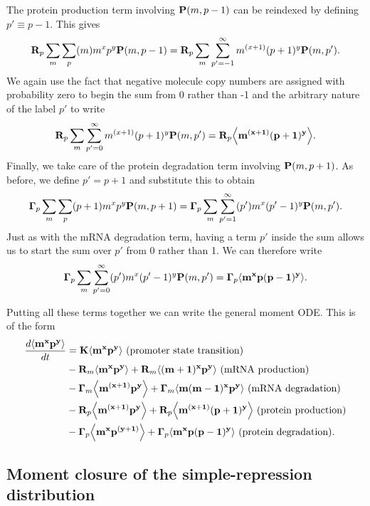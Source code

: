 The protein production term involving $\mathbf{P}(m, p - 1)$ can be reindexed by 
defining $p' \equiv p - 1$. This gives
\begin{equation}
  \mathbf{R}_p \sum_m \sum_p (m) m^x p^y \mathbf{P}(m, p - 1) =
  \mathbf{R}_p \sum_m \sum_{p'=-1}^\infty m^{(x + 1)} (p + 1)^y \mathbf{P}(m, p').
\end{equation}
We again use the fact that negative molecule copy numbers are assigned with
probability zero to begin the sum from 0 rather than -1 and the arbitrary nature
of the label $p'$ to write
\begin{equation}
  \mathbf{R}_p \sum_m \sum_{p'=0}^\infty m^{(x + 1)} (p + 1)^y \mathbf{P}(m, p') =
  \mathbf{R}_p \mathbf{\left\langle m^{(x + 1)} (p + 1)^y \right\rangle}.
\end{equation}
Finally, we take care of the protein degradation term involving $\mathbf{P}(m, p + 1)$.
As before, we define $p' = p + 1$ and substitute this to obtain
\begin{equation}
  \mathbf{\Gamma}_p \sum_m \sum_p (p + 1) m^x p^y \mathbf{P}(m, p + 1) =
  \mathbf{\Gamma}_p \sum_m \sum_{p'=1}^\infty (p') m^x (p' - 1)^y \mathbf{P}(m, p').
\end{equation}
Just as with the mRNA degradation term, having a term $p'$  inside the sum
allows us to start the sum over $p'$ from 0 rather than 1. We can therefore
write
\begin{equation}
  \mathbf{\Gamma}_p \sum_m \sum_{p'=0}^\infty (p') m^x (p' - 1)^y \mathbf{P}(m, p') =
  \mathbf{\Gamma}_p \mathbf{\left\langle m^x p (p - 1)^y \right\rangle}.
\end{equation}

Putting all these terms together we can write the general moment ODE. This is
of the form
\begin{equation}
  \begin{aligned}
    {d{\mathbf{\left\langle m^x p^y \right\rangle}} \over dt} &=
    \mathbf{K} \mathbf{\left\langle m^x p^y \right\rangle}
    \text{  (promoter state transition)}\\
    &- \mathbf{R}_m \mathbf{\left\langle m^x p^y \right\rangle} + \mathbf{R}_m \mathbf{\left\langle (m+1)^x p^y \right\rangle}
    \text{  (mRNA production)}\\
    &- \mathbf{\Gamma}_m \mathbf{\left\langle m^{(x + 1)} p^y \right\rangle} + \mathbf{\Gamma}_m \mathbf{\left\langle m (m - 1)^x p^y \right\rangle}
    \text{  (mRNA degradation)}\\
    &- \mathbf{R}_p \mathbf{\left\langle m^{(x + 1)} p^y \right\rangle} + \mathbf{R}_p \mathbf{\left\langle m^{(x + 1)} (p + 1)^y \right\rangle}
    \text{  (protein production)}\\
    &- \mathbf{\Gamma}_p \mathbf{\left\langle m^x p^{(y + 1)} \right\rangle} + \mathbf{\Gamma}_p \mathbf{\left\langle m^x p (p - 1)^y \right\rangle}
    \text{  (protein degradation)}.
  \end{aligned}
  \label{seq_mom_ode}
\end{equation}

\subsection{Moment closure of the simple-repression distribution}

